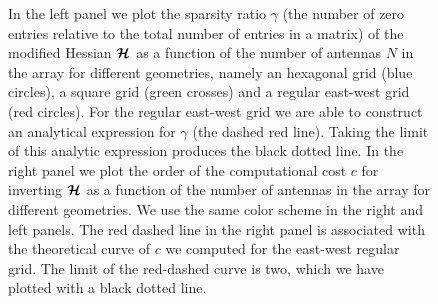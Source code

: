 \documentclass[useAMS,usenatbib]{mn2e}
\newcommand{\bmH}{\bmath{\mathcal{H}}}
\begin{document}
\begin{figure}
\centering
{}
\caption{In the left panel we plot the sparsity ratio $\gamma$ (the number of zero entries relative to the total number of entries in a matrix) of the modified Hessian $\bmH$ as a function of the number 
of antennas $N$ in the array for different geometries, namely an hexagonal grid (blue circles), a square grid (green crosses) and a regular east-west grid (red circles). For the regular east-west grid we are able to construct an analytical expression for $\gamma$ (the dashed red line). Taking the limit 
of this analytic expression produces the black dotted line. In the right panel we plot the order of the computational cost $c$ for inverting $\bmH$ as a function of the number 
of antennas in the array for different geometries. We use the same color scheme in the right and left panels. The red dashed line 
in the right panel is associated with the theoretical curve of $c$ we computed for the east-west regular grid. The limit of the red-dashed curve is two, which we 
have plotted with a black dotted line.
\label{fig:sparsity}} 
\end{figure}
\end{document}
